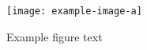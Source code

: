 \documentclass[../main.tex]{subfiles}
\begin{document}
\begin{figure}[h]
\begin{center}
\texttt{[image: example-image-a]}
\caption{Example figure text}
\label{fig:template}
\end{center}
\end{figure}
\end{document}
